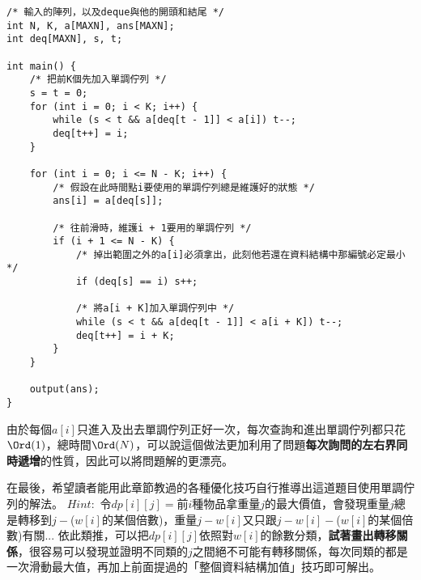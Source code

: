 \begin{lstlisting}[caption=滑動最大值的程式碼]
/* 輸入的陣列，以及deque與他的開頭和結尾 */
int N, K, a[MAXN], ans[MAXN];
int deq[MAXN], s, t;

int main() {
    /* 把前K個先加入單調佇列 */
    s = t = 0;
    for (int i = 0; i < K; i++) {
        while (s < t && a[deq[t - 1]] < a[i]) t--;
        deq[t++] = i;
    }

    for (int i = 0; i <= N - K; i++) {
        /* 假設在此時間點i要使用的單調佇列總是維護好的狀態 */
        ans[i] = a[deq[s]];

        /* 往前滑時，維護i + 1要用的單調佇列 */
        if (i + 1 <= N - K) {
            /* 掉出範圍之外的a[i]必須拿出，此刻他若還在資料結構中那編號必定最小 */
            if (deq[s] == i) s++;

            /* 將a[i + K]加入單調佇列中 */
            while (s < t && a[deq[t - 1]] < a[i + K]) t--;
            deq[t++] = i + K;
        }
    }

    output(ans);
}
\end{lstlisting}

由於每個$a[i]$只進入及出去單調佇列正好一次，每次查詢和進出單調佇列都只花$\Ord(1)$，總時間$\Ord(N)$，可以說這個做法更加利用了問題\textbf{每次詢問的左右界同時遞增}的性質，因此可以將問題解的更漂亮。

在最後，希望讀者能用此章節教過的各種優化技巧自行推導出這道題目使用單調佇列的解法。
$Hint:$ 令$dp[i][j] = $前$i$種物品拿重量$j$的最大價值，會發現重量$j$總是轉移到$j - $($w[i]$的某個倍數)，重量$j - w[i]$又只跟$j - w[i] - $($w[i]$的某個倍數)有關... 依此類推，可以把$dp[i][j]$依照對$w[i]$的餘數分類，\textbf{試著畫出轉移關係}，很容易可以發現並證明不同類的$j$之間絕不可能有轉移關係，每次同類的都是一次滑動最大值，再加上前面提過的「整個資料結構加值」技巧即可解出。

